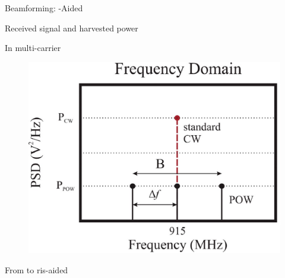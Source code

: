 \documentclass[presentation,xcolor={table},9pt]{beamer}
\begin{document}
\begin{section}{Beamforming: -Aided }
\begin{frame}{Received signal and harvested power}
\begin{alertblock}{In multi-carrier  \textellipsis}
\begin{figure}
{{						\includegraphics{../assets/viva/multisine_frequency_domain.eps}
					}
				}
			\end{figure}
		\end{alertblock}
	\end{frame}

	\begin{frame}{From  to \gls{ris}-aided }
		\begin{figure}[H]
			\centering
			\def\svgwidth{0.5\columnwidth}
			
		\end{figure}


\end{frame}
\end{section}
\end{document}
